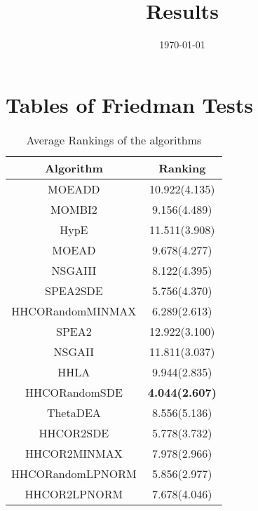 \documentclass{article}
\title{Results}
\author{}
\date{\today}
\begin{document}
\oddsidemargin 0in \topmargin 0in\maketitle
\section{Tables of Friedman Tests}
\begin{table}[!htp]
\centering
\caption{Average Rankings of the algorithms
}\begin{tabular}{|c|c|}
\hline
Algorithm&Ranking\\
\hline
MOEADD&10.922(4.135)\\\hline
MOMBI2&9.156(4.489)\\\hline
HypE&11.511(3.908)\\\hline
MOEAD&9.678(4.277)\\\hline
NSGAIII&8.122(4.395)\\\hline
SPEA2SDE&5.756(4.370)\\\hline
HHCORandomMINMAX&6.289(2.613)\\\hline
SPEA2&12.922(3.100)\\\hline
NSGAII&11.811(3.037)\\\hline
HHLA&9.944(2.835)\\\hline
HHCORandomSDE& {\bf 4.044(2.607)}\\\hline
ThetaDEA&8.556(5.136)\\\hline
HHCOR2SDE&5.778(3.732)\\\hline
HHCOR2MINMAX&7.978(2.966)\\\hline
HHCORandomLPNORM&5.856(2.977)\\\hline
HHCOR2LPNORM&7.678(4.046)\\\hline
\end{tabular}
\end{table}
\end{document}
